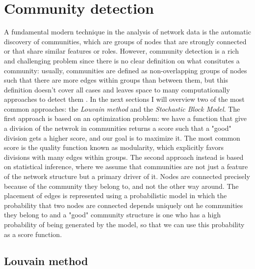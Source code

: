 \section{Community detection}
A fundamental modern technique in the analysis of network data is the automatic discovery of communities, which are groups of nodes that are strongly connected or that share similar features or roles. However, community detection is a rich and challenging problem since there is no clear definition on what consitutes a community: usually, communities are defined as non-overlapping groups of nodes such that there are more edges within groups than between them, but this definition doesn't cover all cases and leaves space to many computationally approaches to detect them \cite{fortunato202220years}. In the next sections I will overview two of the most common approaches: the \textit{Louvain method} and the \textit{Stochastic Block Model}. 
The first approach is based on an optimization problem: we have a function that give a division of the netwrok in communities returns a score such that a "good" division gets a higher score, and our goal is to maximize it. The most common score is the quality function known as modularity, which explicitly favors divisions with many edges within groups.
The second approach instead is based on statistical inference, where we assume that communities are not just a feature of the network structure but a primary driver of it. Nodes are connected precisely because of the community they belong to, and not the other way around. The placement of edges is represented using a probabilistic model in which the probability that two nodes are connected depends uniquely ont he communities they belong to and a "good" community structure is one who has a high probability of being generated by the model, so that we can use this probability as a score function.


\subsection{Louvain method}

